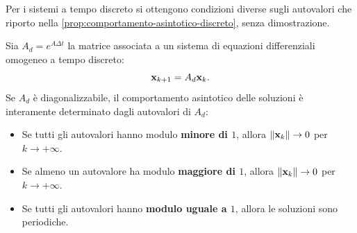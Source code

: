 Per i sistemi a tempo discreto si ottengono condizioni diverse sugli autovalori
che riporto nella \autoref{prop:comportamento-asintotico-discreto}, senza
dimostrazione.
\begin{prop}
    Sia $A_d = e^{A\Delta t}$ la matrice associata a un sistema di equazioni differenziali omogeneo
    a tempo discreto:
    \begin{equation*}
        \mathbf{x}_{k+1} = A_d \mathbf{x}_k.
    \end{equation*}
    Se $A_d$ è diagonalizzabile, il comportamento asintotico delle soluzioni è interamente
    determinato dagli autovalori di $A_d$:
    \begin{itemize}
        \item Se tutti gli autovalori hanno modulo \textbf{minore di $1$}, allora $\lVert\mathbf{x}_k\rVert \to 0$ per $k \to +\infty$.%
        \item Se almeno un autovalore ha modulo \textbf{maggiore di $1$}, allora $\lVert\mathbf{x}_k\rVert \to 0$ per $k \to +\infty$.%
        \item Se tutti gli autovalori hanno \textbf{modulo uguale a $1$}, allora le soluzioni sono periodiche.
    \end{itemize}
    \label{prop:comportamento-asintotico-discreto}
\end{prop}